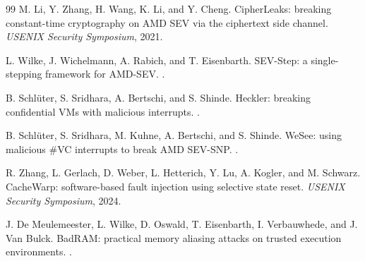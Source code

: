 \documentclass[11pt,a4paper]{article}
\begin{document}
\begin{thebibliography}{99}
M. Li, Y. Zhang, H. Wang, K. Li, and Y. Cheng.
\newblock CipherLeaks: breaking constant-time cryptography on AMD SEV via the
ciphertext side channel.
\newblock \emph{USENIX Security Symposium}, 2021.

L. Wilke, J. Wichelmann, A. Rabich, and T. Eisenbarth.
\newblock SEV-Step: a single-stepping framework for AMD-SEV.
.

B. Schl\"uter, S. Sridhara, A. Bertschi, and S. Shinde.
\newblock Heckler: breaking confidential VMs with malicious interrupts.
.

B. Schl\"uter, S. Sridhara, M. Kuhne, A. Bertschi, and S. Shinde.
\newblock WeSee: using malicious \#VC interrupts to break AMD SEV-SNP.
.

R. Zhang, L. Gerlach, D. Weber, L. Hetterich, Y. Lu, A. Kogler, and M. Schwarz.
\newblock CacheWarp: software-based fault injection using selective state reset.
\newblock \emph{USENIX Security Symposium}, 2024.

J. De Meulemeester, L. Wilke, D. Oswald, T. Eisenbarth, I. Verbauwhede, and
J. Van Bulck.
\newblock BadRAM: practical memory aliasing attacks on trusted execution
environments.
.

\end{thebibliography}
\end{document}
